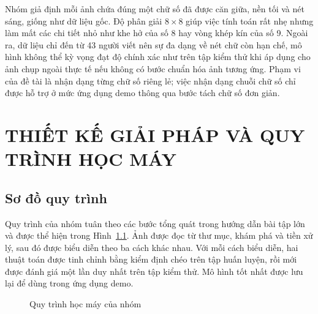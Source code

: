 \documentclass[a4paper,oneside]{report}
\begin{document}
Nhóm giả định mỗi ảnh chứa đúng một chữ số đã được căn giữa, nền tối và nét sáng, giống như dữ liệu gốc. Độ
phân giải $8 \times 8$ giúp việc tính toán rất nhẹ nhưng làm mất các chi tiết nhỏ như khe hở của số 8 hay vòng
khép kín của số 9. Ngoài ra, dữ liệu chỉ đến từ 43 người viết nên sự đa dạng về nét chữ còn hạn chế, mô hình
không thể kỳ vọng đạt độ chính xác như trên tập kiểm thử khi áp dụng cho ảnh chụp ngoài thực tế nếu không có
bước chuẩn hóa ảnh tương ứng. Phạm vi của đề tài là nhận dạng từng chữ số riêng lẻ; việc nhận dạng chuỗi chữ số
chỉ được hỗ trợ ở mức ứng dụng demo thông qua bước tách chữ số đơn giản.

\chapter{THIẾT KẾ GIẢI PHÁP VÀ QUY TRÌNH HỌC MÁY}

\section{Sơ đồ quy trình}

Quy trình của nhóm tuân theo các bước tổng quát trong hướng dẫn bài tập lớn và được thể hiện trong
Hình~\ref{fig:pipeline}. Ảnh được đọc từ thư mục, khám phá và tiền xử lý, sau đó được biểu diễn theo ba cách khác
nhau. Với mỗi cách biểu diễn, hai thuật toán được tinh chỉnh bằng kiểm định chéo trên tập huấn luyện, rồi mới
được đánh giá một lần duy nhất trên tập kiểm thử. Mô hình tốt nhất được lưu lại để dùng trong ứng dụng demo.

\begin{figure}[H]
\centering
{}
\caption{Quy trình học máy của nhóm}
\label{fig:pipeline}
\end{figure}
\end{document}
